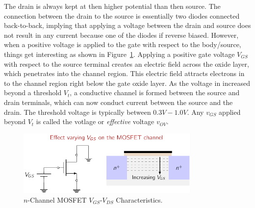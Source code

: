 The drain is always kept at then higher potential than then source. The connection between the drain to the source is essentially two diodes connected back-to-back, implying that applying a voltage between the drain and source does not result in any current because one of the diodes if reverse biased. However, when a positive voltage is applied to the gate with respect to the body/source, things get interesting as shown in Figure~\ref{fig:03-mosfet-gate-volt}. Applying a positive gate voltage $V_{GS}$ with respect to the source terminal creates an electric field across the oxide layer, which penetrates into the channel region. This electric field attracts electrons in to the channel region right below the gate oxide layer. As the voltage in increased beyond a threshold $V_t$, a conductive channel is formed between the source and drain terminals, which can now conduct current between the source and the drain. The threshold voltage is typically between $0.3V-1.0V$. Any $v_{GS}$ applied beyond $V_t$ is called the  votlage or \textit{effective} voltage $v_{OV}$.

\begin{figure}[t]
    \centering
    \includegraphics[width=0.8\textwidth]{figures/ch03/fig03-mosfet-vgs-vds.pdf}
    \caption{$n$-Channel MOSFET $V_{GS}$-$V_{DS}$ Characteristics.}
    \label{fig:03-mosfet-gate-volt}
\end{figure}

